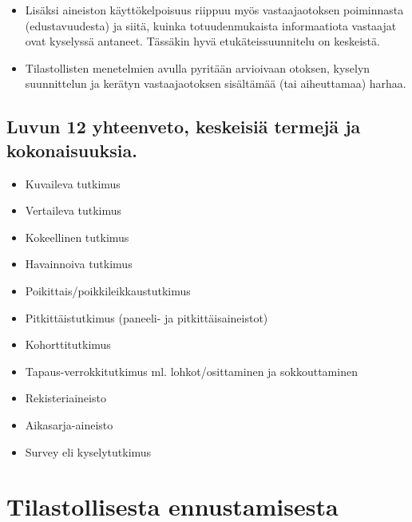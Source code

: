 \documentclass[
]{book}
\providecommand{\tightlist}{%
  \setlength{\itemsep}{0pt}\setlength{\parskip}{0pt}}
\begin{document}
\begin{itemize}
  \begin{itemize}
  \tightlist
  \item
    Lisäksi aineiston käyttökelpoisuus riippuu myös vastaajaotoksen poiminnasta (edustavuudesta) ja siitä, kuinka totuudenmukaista informaatiota vastaajat ovat kyselyssä antaneet. Tässäkin hyvä etukäteissuunnitelu on keskeistä.
  \item
    Tilastollisten menetelmien avulla pyritään arvioivaan otoksen, kyselyn suunnittelun ja kerätyn vastaajaotoksen sisältämää (tai aiheuttamaa) harhaa.
  \end{itemize}
\end{itemize}

\hypertarget{luvun-12-yhteenveto-keskeisiuxe4-termejuxe4-ja-kokonaisuuksia.}{%
\section{Luvun 12 yhteenveto, keskeisiä termejä ja kokonaisuuksia.}\label{luvun-12-yhteenveto-keskeisiuxe4-termejuxe4-ja-kokonaisuuksia.}}

\begin{itemize}
\tightlist
\item
  Kuvaileva tutkimus
\item
  Vertaileva tutkimus
\item
  Kokeellinen tutkimus
\item
  Havainnoiva tutkimus
\item
  Poikittais/poikkileikkaustutkimus
\item
  Pitkittäistutkimus (paneeli- ja pitkittäisaineistot)
\item
  Kohorttitutkimus
\item
  Tapaus-verrokkitutkimus ml. lohkot/osittaminen ja sokkouttaminen
\item
  Rekisteriaineisto
\item
  Aikasarja-aineisto
\item
  Survey eli kyselytutkimus
\end{itemize}


\hypertarget{luku13}{%
\chapter{Tilastollisesta ennustamisesta}\label{luku13}}
\end{document}
